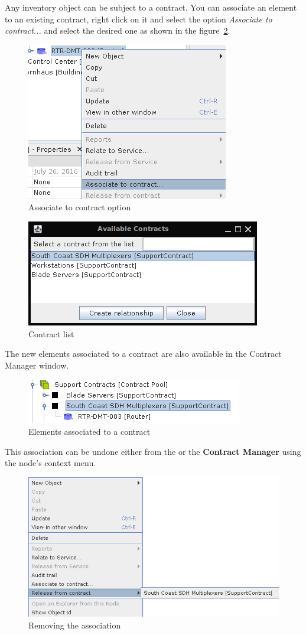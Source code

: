 \documentclass[a4paper]{article}
\begin{document}
		Any inventory object can be subject to a contract. You can associate an element to an existing contract, right click on it and select the option \textit{Associate to contract...} and select the desired one as shown in the figure~\ref{fig:contract_manager_contract_list}.
		\begin{figure}[h!]
			\centering
			\includegraphics[width=0.4\linewidth]{img/contract_manager_associate_option.png}
			\caption{Associate to contract option}
			\label{fig:contract_manager_associate_option}
		\end{figure}		
		\newline
		\begin{figure}[h!]
			\centering
			\includegraphics[width=0.4\linewidth]{img/contract_manager_contract_list.png}
			\caption{Contract list}
			\label{fig:contract_manager_contract_list}
		\end{figure}
		
		The new elements associated to a contract are also available in the Contract Manager window.
		\begin{figure}[h!]
			\centering
			\includegraphics[width=0.4\linewidth]{img/contract_manager_elements.png}
			\caption{Elements associated to a contract}
			\label{fig:contract_manager_elements}
		\end{figure}
		
		\newpage
		This association can be undone either from the \textbf{} or the \textbf{Contract Manager} using the node's context menu.
		\begin{figure}[h!]
			\centering
			\includegraphics[width=0.6\linewidth]{img/contract_manager_release_from_contract.png}
			\caption{Removing the association}
			\label{fig:contract_manager_release_from_contract}
		\end{figure}
		
\end{document}
